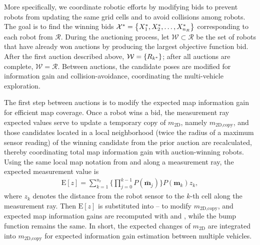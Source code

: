 More specifically, we coordinate robotic efforts by modifying bids to prevent robots from updating the same grid cells and to avoid collisions among robots. The goal is to find the winning bids $\mathcal X^*=\left\{ X^*_{1},X^*_{2},\dots,X^*_{n_R} \right\}$ corresponding to each robot from $\mathcal R$. During the auctioning process, let $\mathcal W\subset\mathcal R$ be the set of robots that have already won auctions by producing the largest objective function bid. After the first auction described above, $\mathcal W=\left\{ R_{k^*} \right\}$; after all auctions are complete, $\mathcal W=\mathcal R$. Between auctions, the candidate poses are modified for information gain and collision-avoidance, coordinating the multi-vehicle exploration.

The first step between auctions is to modify the expected map information gain for efficient map coverage.  Once a robot wins a bid, the measurement ray expected values serve to update a temporary copy of $ m_\text{2D}$, namely $ m_\text{2D,copy}$, and those candidates located in a local neighborhood (twice the radius of a maximum sensor reading) of the winning candidate from the prior auction are recalculated, thereby coordinating total map information gain with auction-winning robots. Using the same local map notation from  and  along a measurement ray, the expected measurement value is
\begin{align}
\label{eqn:ExpectedMeasRay}
\text{E}[z]=\sum_{k=1}^{n_{r}}\bigg\{\prod_{j=0}^{k-1}P(\bar{\mathbf{m}}_j)\bigg\}P(\mathbf{m}_k)z_k,
\end{align}
where $z_k$ denotes the distance from the robot sensor to the $k$-th cell along the measurement ray. Then $\text{E}[z]$ is substituted into -- to modify $ m_\text{2D,copy}$, and expected map information gains are recomputed with  and , while the bump function  remains the same. In short, the expected changes of $ m_\text{2D}$ are integrated into $ m_\text{2D,copy}$ for expected information gain estimation between multiple vehicles.


